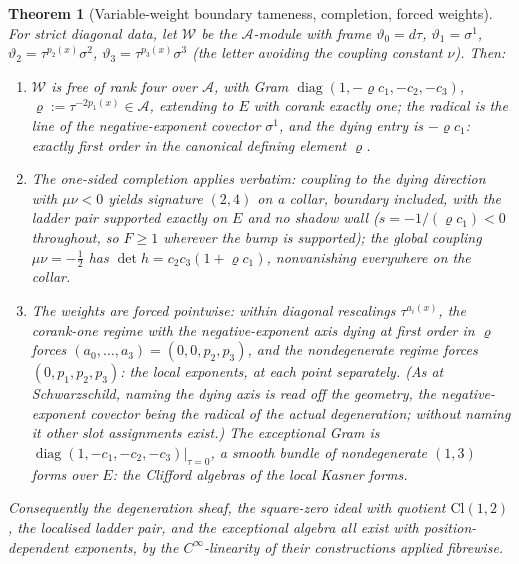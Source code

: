\documentclass[11pt]{article}
\newtheorem{theorem}{Theorem}[section]
\theoremstyle{definition}
\theoremstyle{plain}
\newcommand{\changedmark}[2]{\marginpar{\raggedright\scriptsize\color{#1}#2}}
\providecommand{\Cl}{}\renewcommand{\Cl}{\mathrm{Cl}}
\providecommand{\shW}{}\renewcommand{\shW}{\mathcal{W}}
\begin{document}
\begin{theorem}[Variable-weight boundary tameness, completion, forced weights]\label{c:sheaf.variable-weight-boundary-tameness-completion-forced}
\changedmark{gray}{reworded}
For strict diagonal data, let $\shW$ be the $\mathcal{A}$-module with frame $\vartheta_0 = d\tau$, $\vartheta_1 = \sigma^1$, $\vartheta_2 = \tau^{p_2(x)}\sigma^2$, $\vartheta_3 = \tau^{p_3(x)}\sigma^3$ (the letter avoiding the coupling constant $\nu$). Then:
\begin{enumerate}
\item $\shW$ is free of rank four over $\mathcal{A}$, with Gram $\operatorname{diag}(1, -\varrho c_1, -c_2, -c_3)$, $\varrho := \tau^{-2p_1(x)} \in \mathcal{A}$, extending to $E$ with corank exactly one; the radical is the line of the negative-exponent covector $\sigma^1$, and the dying entry is $-\varrho c_1$: exactly first order in the canonical defining element $\varrho$.
\item The one-sided completion applies verbatim: coupling to the dying direction with $\mu\nu < 0$ yields signature $(2,4)$ on a collar, boundary included, with the ladder pair supported exactly on $E$ and no shadow wall ($s = -1/(\varrho c_1) < 0$ throughout, so $F \geq 1$ wherever the bump is supported); the global coupling $\mu\nu = -\tfrac12$ has $\det h = c_2c_3(1 + \varrho c_1)$, nonvanishing everywhere on the collar.
\item The weights are forced pointwise: within diagonal rescalings $\tau^{a_i(x)}$, the corank-one regime \emph{with the negative-exponent axis dying at first order in $\varrho$} forces $(a_0,\dots,a_3) = (0,0,p_2,p_3)$, and the nondegenerate regime forces $(0,p_1,p_2,p_3)$: the local exponents, at each point separately. (As at Schwarzschild, naming the dying axis is read off the geometry, the negative-exponent covector being the radical of the actual degeneration; without naming it other slot assignments exist.) The exceptional Gram is $\operatorname{diag}(1,-c_1,-c_2,-c_3)|_{\tau=0}$, a smooth bundle of nondegenerate $(1,3)$ forms over $E$: the Clifford algebras of the local Kasner forms.
\end{enumerate}
Consequently the degeneration sheaf, the square-zero ideal with quotient $\Cl(1,2)$, the localised ladder pair, and the exceptional algebra all exist with position-dependent exponents, by the $C^\infty$-linearity of their constructions applied fibrewise.
\end{theorem}
\end{document}
